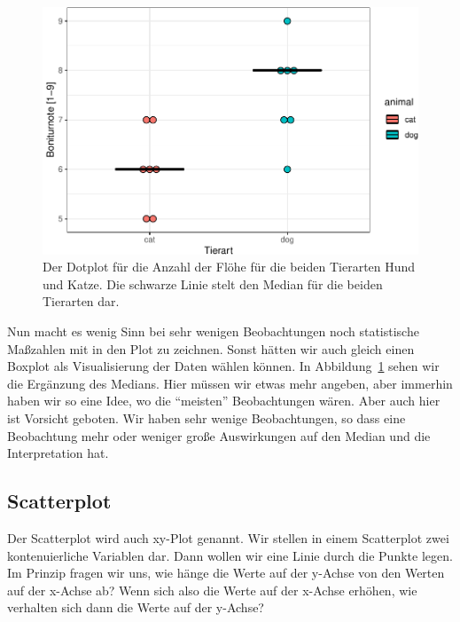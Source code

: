 \documentclass[
  letterpaper,
]{scrbook}
\begin{document}
\begin{figure}[H]

{\centering \includegraphics{./eda-ggplot_files/figure-pdf/fig-dotplot-flea-eda-1-1.pdf}

}

\caption{\label{fig-dotplot-flea-eda-1}Der Dotplot für die Anzahl der
Flöhe für die beiden Tierarten Hund und Katze. Die schwarze Linie stelt
den Median für die beiden Tierarten dar.}

\end{figure}

Nun macht es wenig Sinn bei sehr wenigen Beobachtungen noch statistische
Maßzahlen mit in den Plot zu zeichnen. Sonst hätten wir auch gleich
einen Boxplot als Visualisierung der Daten wählen können. In
Abbildung~\ref{fig-dotplot-flea-eda-1} sehen wir die Ergänzung des
Medians. Hier müssen wir etwas mehr angeben, aber immerhin haben wir so
eine Idee, wo die ``meisten'' Beobachtungen wären. Aber auch hier ist
Vorsicht geboten. Wir haben sehr wenige Beobachtungen, so dass eine
Beobachtung mehr oder weniger große Auswirkungen auf den Median und die
Interpretation hat.

\hypertarget{sec-eda-scatter}{%
\subsection{Scatterplot}\label{sec-eda-scatter}}

Der Scatterplot wird auch xy-Plot genannt. Wir stellen in einem
Scatterplot zwei kontenuierliche Variablen dar. Dann wollen wir eine
Linie durch die Punkte legen. Im Prinzip fragen wir uns, wie hänge die
Werte auf der y-Achse von den Werten auf der x-Achse ab? Wenn sich also
die Werte auf der x-Achse erhöhen, wie verhalten sich dann die Werte auf
der y-Achse?
\end{document}
